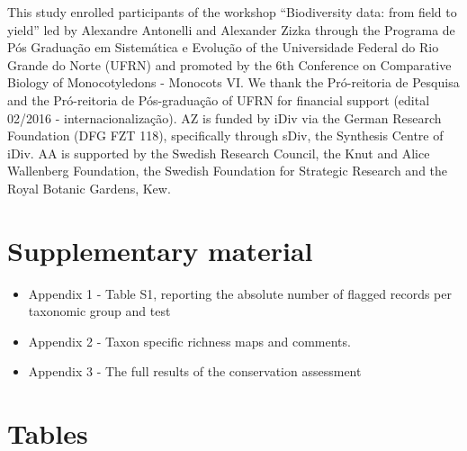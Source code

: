 \documentclass[fleqn,10pt,lineno]{wlpeerj} %
\begin{document}
This study enrolled participants of the workshop ``Biodiversity data: from field to yield'' led by Alexandre Antonelli and Alexander Zizka through the Programa de Pós Graduação em Sistemática e Evolução of the Universidade Federal do Rio Grande do Norte (UFRN) and promoted by the 6th Conference on Comparative Biology of Monocotyledons - Monocots VI. We thank the Pró-reitoria de Pesquisa and the Pró-reitoria de Pós-graduação of UFRN for financial support (edital 02/2016 - internacionalização). AZ is funded by iDiv via the German Research Foundation (DFG FZT 118), specifically through sDiv, the Synthesis Centre of iDiv. AA is supported by the Swedish Research Council, the Knut and Alice Wallenberg Foundation, the Swedish Foundation for Strategic Research and the Royal Botanic Gardens, Kew.

\hypertarget{supplementary-material}{%
\section*{Supplementary material}\label{supplementary-material}}

\begin{itemize}
\item
  Appendix 1 - Table S1, reporting the absolute number of flagged records per taxonomic group and test
\item
  Appendix 2 - Taxon specific richness maps and comments.
\item
  Appendix 3 - The full results of the conservation assessment
\end{itemize}

\hypertarget{tables}{%
\section*{Tables}\label{tables}}
\end{document}
